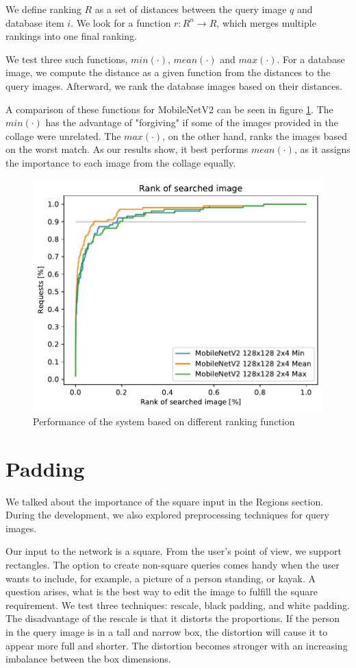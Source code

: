 We define ranking $R$ as a set of distances between the query image $q$ and database item $i$. We look for a function $r: R^n \rightarrow R$, which merges multiple rankings into one final ranking.

We test three such functions, $min(\cdot)$, $mean(\cdot)$ and $max(\cdot)$.  For a database image, we compute the distance as a given function from the distances to the query images. Afterward, we rank the database images based on their distances. 

A comparison of these functions for MobileNetV2 can be seen in figure \ref{fig:ranking_funcs}. The $min(\cdot)$ has the advantage of "forgiving" if some of the images provided in the collage were unrelated. The $max(\cdot)$, on the other hand, ranks the images based on the worst match. As our results show, it best performs $mean(\cdot)$, as it assigns the importance to each image from the collage equally.

\begin{figure}
\centering
\includegraphics[width=0.8\linewidth]{graphs/70c56dc52be92e048f57b9bdfb35ddce2be41fd2454ae360588da2e387b09de5.pdf}
\caption{Performance of the system based on different ranking function}
\label{fig:ranking_funcs}
\end{figure}

\section{Padding}

We talked about the importance of the square input in the Regions section. During the development, we also explored preprocessing techniques for query images.

Our input to the network is a square. From the user's point of view, we support rectangles. The option to create non-square queries comes handy when the user wants to include, for example, a picture of a person standing, or kayak. A question arises, what is the best way to edit the image to fulfill the square requirement. We test three techniques: rescale, black padding, and white padding. The disadvantage of the rescale is that it distorts the proportions. If the person in the query image is in a tall and narrow box, the distortion will cause it to appear more full and shorter. The distortion becomes stronger with an increasing imbalance between the box dimensions. 

